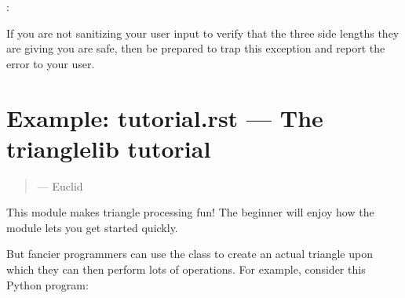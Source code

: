 \documentclass[letterpaper,10pt,english]{sphinxmanual}
\begin{document}
\begin{sphinxVerbatim}[commandchars=\\\{\}]
   
  
: 
\end{sphinxVerbatim}

If you are not sanitizing your user input
to verify that the three side lengths they are giving you are safe,
then be prepared to trap this exception
and report the error to your user.


\chapter{Example: tutorial.rst — The trianglelib tutorial}
\label{\detokenize{tutorial:example-tutorial-rst-the-trianglelib-tutorial}}\label{\detokenize{tutorial::doc}}\begin{quote}

\ignorespaces 
{} — Euclid
\end{quote}

This module makes triangle processing fun!
The beginner will enjoy how the {\hyperref[\detokenize{api:module-trianglelib.utils}]{}} module
lets you get started quickly.

\begin{sphinxVerbatim}[commandchars=\\\{\}]
   
  
\end{sphinxVerbatim}

But fancier programmers can use the {\hyperref[\detokenize{api:trianglelib.shape.Triangle}]{}}
class to create an actual triangle 
upon which they can then perform lots of operations.
For example, consider this Python program:
\end{document}
